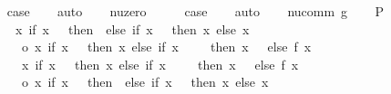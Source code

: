 \begin{isabellebody}
\ \isamarkupfalse%
\ {\isacharquery}{\kern0pt}case\isanewline
\ \ \isamarkupfalse%
\ auto\isanewline
{}\isamarkupfalse%
\isanewline
\ \ \isamarkupfalse%
\ nu{\isacharunderscore}{\kern0pt}zero\isanewline
\ \ \isamarkupfalse%
\ \isamarkupfalse%
\ {\isacharquery}{\kern0pt}case\isanewline
\ \ \isamarkupfalse%
\ auto\isanewline
{}\isamarkupfalse%
\isanewline
\ \ \isamarkupfalse%
\ {\isacharparenleft}{\kern0pt}nu{\isacharunderscore}{\kern0pt}comm\ g{\isacharparenright}{\kern0pt}\isanewline
\isanewline
\ \ \isamarkupfalse%
\ P{}{\isacharcolon}{\kern0pt}\isanewline
\ \ \ \ {\isachardoublequoteopen}{\isacharparenleft}{\kern0pt}{\isasymlambda}x{\isachardot}{\kern0pt}\ if\ x\ {\isacharequal}{\kern0pt}\ {}\ then\ {}\ else\ if\ x\ {\isacharequal}{\kern0pt}\ {}\ then\ x\ else\ x{\isacharparenright}{\kern0pt}\isanewline
\ \ \ \ \ o\ {\isacharparenleft}{\kern0pt}{\isasymlambda}x{\isachardot}{\kern0pt}\ if\ x\ {\isacharequal}{\kern0pt}\ {}\ then\ x\ else\ {\isacharparenleft}{\kern0pt}if\ x\ {\isacharminus}{\kern0pt}\ {}\ {\isacharequal}{\kern0pt}\ {}\ then\ x\ {\isacharminus}{\kern0pt}\ {}\ else\ f\ {\isacharparenleft}{\kern0pt}x\ {\isacharminus}{\kern0pt}\ {}\ {\isacharminus}{\kern0pt}\ {}{\isacharparenright}{\kern0pt}\ {\isacharplus}{\kern0pt}\ {}{\isacharparenright}{\kern0pt}\ {\isacharplus}{\kern0pt}\ {}{\isacharparenright}{\kern0pt}\ {\isacharequal}{\kern0pt}\isanewline
\ \ \ \ \ {\isacharparenleft}{\kern0pt}{\isasymlambda}x{\isachardot}{\kern0pt}\ if\ x\ {\isacharequal}{\kern0pt}\ {}\ then\ x\ else\ {\isacharparenleft}{\kern0pt}if\ x\ {\isacharminus}{\kern0pt}\ {}\ {\isacharequal}{\kern0pt}\ {}\ then\ x\ {\isacharminus}{\kern0pt}\ {}\ else\ f\ {\isacharparenleft}{\kern0pt}x\ {\isacharminus}{\kern0pt}\ {}\ {\isacharminus}{\kern0pt}\ {}{\isacharparenright}{\kern0pt}\ {\isacharplus}{\kern0pt}\ {}{\isacharparenright}{\kern0pt}\ {\isacharplus}{\kern0pt}\ {}{\isacharparenright}{\kern0pt}\isanewline
\ \ \ \ \ o\ {\isacharparenleft}{\kern0pt}{\isasymlambda}x{\isachardot}{\kern0pt}\ if\ x\ {\isacharequal}{\kern0pt}\ {}\ then\ {}\ else\ if\ x\ {\isacharequal}{\kern0pt}\ {}\ then\ x\ else\ x{\isacharparenright}{\kern0pt}{\isachardoublequoteclose}\isanewline

\end{isabellebody}
